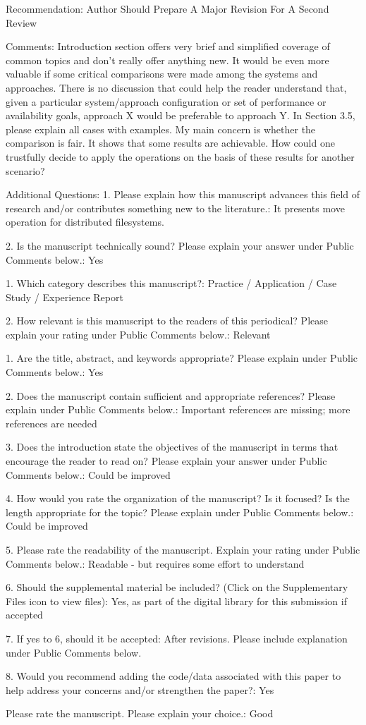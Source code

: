 \documentclass[10pt]{article}
\begin{document}
\begin{spverbatim}
Recommendation: Author Should Prepare A Major Revision For A Second Review

Comments:
Introduction section offers very brief and simplified coverage of common topics and don't really offer anything new.
It would be even more valuable if some critical comparisons were made among the systems and approaches. There is no discussion that could help the reader understand that, given a particular system/approach configuration or set of performance or availability goals, approach X would be preferable to approach Y.
In Section 3.5, please explain all cases with examples.
My main concern is whether the comparison is fair. It shows that some results are achievable. How could one trustfully decide to apply the operations on the basis of these results for another scenario?

Additional Questions:
1.  Please explain how this manuscript advances this field of research and/or contributes something new to the literature.: It presents move operation for distributed filesystems.

2. Is the manuscript technically sound? Please explain your answer under Public Comments below.: Yes

1. Which category describes this manuscript?: Practice / Application / Case Study / Experience Report

2. How relevant is this manuscript to the readers of this periodical? Please explain your rating under Public Comments below.: Relevant

1. Are the title, abstract, and keywords appropriate? Please explain under Public Comments below.: Yes

2. Does the manuscript contain sufficient and appropriate references? Please explain under Public Comments below.: Important references are missing; more references are needed

3. Does the introduction state the objectives of the manuscript in terms that encourage the reader to read on? Please explain your answer under Public Comments below.: Could be improved

4. How would you rate the organization of the manuscript? Is it focused? Is the length appropriate for the topic? Please explain under Public Comments below.: Could be improved

5. Please rate the readability of the manuscript. Explain your rating under Public Comments below.: Readable - but requires some effort to understand

6. Should the supplemental material be included? (Click on the Supplementary Files icon to view files): Yes, as part of the digital library for this submission if accepted

7. If yes to 6, should it be accepted: After revisions.  Please include explanation under Public Comments below.

8. Would you recommend adding the code/data associated with this paper to help address your concerns and/or strengthen the paper?: Yes

Please rate the manuscript. Please explain your choice.: Good
\end{spverbatim}
\end{document}
